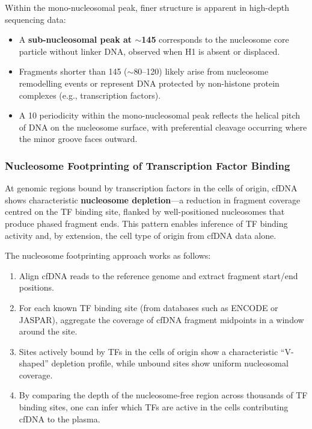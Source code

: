 Within the mono-nucleosomal peak, finer structure is apparent in high-depth sequencing data:
\begin{itemize}[itemsep=2pt]
  \item A \textbf{sub-nucleosomal peak at $\sim$145\basepair{}} corresponds to the nucleosome core particle without linker DNA, observed when H1 is absent or displaced.
  \item Fragments shorter than 145\basepair{} ($\sim$80--120\basepair{}) likely arise from nucleosome remodelling events or represent DNA protected by non-histone protein complexes (e.g., transcription factors).
  \item A 10\basepair{} periodicity within the mono-nucleosomal peak reflects the helical pitch of DNA on the nucleosome surface, with preferential cleavage occurring where the minor groove faces outward.
\end{itemize}

\subsubsection{Nucleosome Footprinting of Transcription Factor Binding}

At genomic regions bound by transcription factors in the cells of origin, cfDNA shows characteristic \textbf{nucleosome depletion}---a reduction in fragment coverage centred on the TF binding site, flanked by well-positioned nucleosomes that produce phased fragment ends. This pattern enables inference of TF binding activity and, by extension, the cell type of origin from cfDNA data alone.

The nucleosome footprinting approach works as follows:
\begin{enumerate}[itemsep=2pt]
  \item Align cfDNA reads to the reference genome and extract fragment start/end positions.
  \item For each known TF binding site (from databases such as ENCODE or JASPAR), aggregate the coverage of cfDNA fragment midpoints in a window around the site.
  \item Sites actively bound by TFs in the cells of origin show a characteristic ``V-shaped'' depletion profile, while unbound sites show uniform nucleosomal coverage.
  \item By comparing the depth of the nucleosome-free region across thousands of TF binding sites, one can infer which TFs are active in the cells contributing cfDNA to the plasma.
\end{enumerate}

